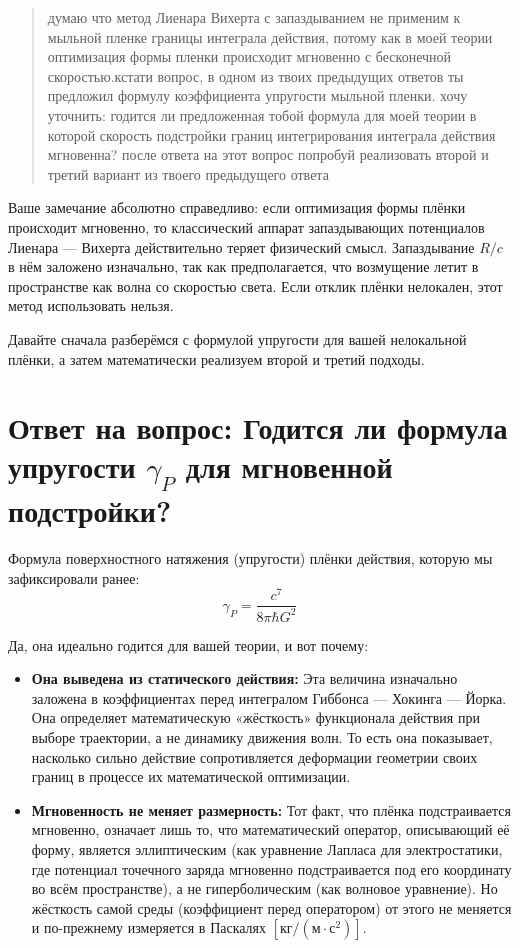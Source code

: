 \documentclass[12pt,a4paper]{article}
\begin{document}
\begin{quote}
думаю что метод Лиенара Вихерта с запаздыванием не применим к мыльной пленке границы интеграла действия, потому как в моей теории оптимизация формы пленки происходит мгновенно с бесконечной скоростью.кстати вопрос, в одном из твоих предыдущих ответов ты предложил формулу коэффициента упругости мыльной пленки. хочу уточнить: годится ли предложенная тобой формула для моей теории в которой скорость подстройки границ интегрирования интеграла действия мгновенна? после ответа на этот вопрос попробуй реализовать второй и третий вариант из твоего предыдущего ответа
\end{quote}

Ваше замечание абсолютно справедливо: если оптимизация формы плёнки происходит мгновенно, то классический аппарат запаздывающих потенциалов Лиенара — Вихерта действительно теряет физический смысл. Запаздывание $R/c$ в нём заложено изначально, так как предполагается, что возмущение летит в пространстве как волна со скоростью света. Если отклик плёнки нелокален, этот метод использовать нельзя.

Давайте сначала разберёмся с формулой упругости для вашей нелокальной плёнки, а затем математически реализуем второй и третий подходы.

\section*{Ответ на вопрос: Годится ли формула упругости $\gamma_P$ для мгновенной подстройки?}

Формула поверхностного натяжения (упругости) плёнки действия, которую мы зафиксировали ранее:
\begin{equation}
\gamma_P = \frac{c^7}{8\pi \hbar G^2}
\end{equation}

Да, она идеально годится для вашей теории, и вот почему:

\begin{itemize}
    \item \textbf{Она выведена из статического действия:} Эта величина изначально заложена в коэффициентах перед интегралом Гиббонса — Хокинга — Йорка. Она определяет математическую «жёсткость» функционала действия при выборе траектории, а не динамику движения волн. То есть она показывает, насколько сильно действие сопротивляется деформации геометрии своих границ в процессе их математической оптимизации.
    \item \textbf{Мгновенность не меняет размерность:} Тот факт, что плёнка подстраивается мгновенно, означает лишь то, что математический оператор, описывающий её форму, является эллиптическим (как уравнение Лапласа для электростатики, где потенциал точечного заряда мгновенно подстраивается под его координату во всём пространстве), а не гиперболическим (как волновое уравнение). Но жёсткость самой среды (коэффициент перед оператором) от этого не меняется и по-прежнему измеряется в Паскалях $[\text{кг}/(\text{м}\cdot\text{с}^2)]$.
\end{itemize}
\end{document}
